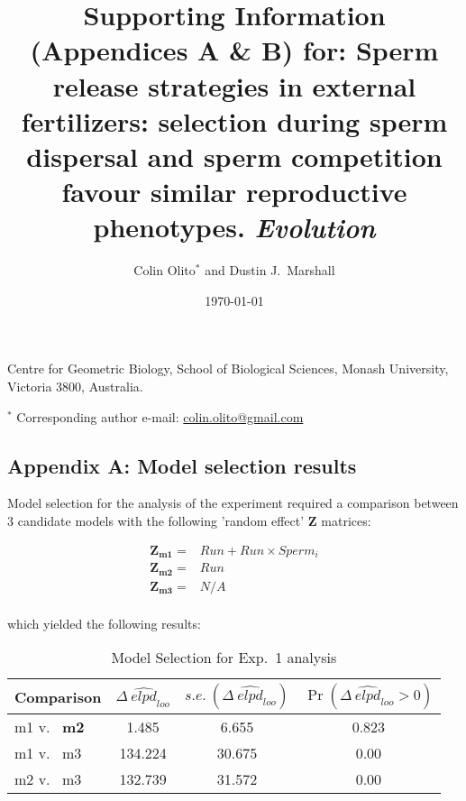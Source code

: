 \documentclass{article}
\title{Supporting Information (Appendices A \& B) for: Sperm release strategies in external fertilizers: selection during sperm dispersal and sperm competition favour similar reproductive phenotypes. \textit{Evolution}}
\author{Colin Olito$^{\ast}$ and Dustin J.~Marshall}
\date{\today}
\begin{document}
\maketitle

\noindent{} Centre for Geometric Biology, School of Biological Sciences, Monash University, Victoria 3800, Australia.
\bigskip

\noindent{} $^\ast$ Corresponding author e-mail: \url{colin.olito@gmail.com}
\bigskip

\newpage




\subsection*{Appendix A: Model selection results}
\renewcommand{\theequation}{S\arabic{equation}}
\setcounter{equation}{0}
\renewcommand{\thefigure}{S\arabic{figure}}
\setcounter{figure}{0}
\renewcommand{\thetable}{S\arabic{table}}
\setcounter{table}{0}


Model selection for the analysis of the  experiment required a comparison between 3 candidate models with the following 'random effect' $\mathbf{Z}$ matrices:

\begin{align*}
	\mathbf{Z_{m1}} = &Run + Run \times Sperm_i \\
	\mathbf{Z_{m2}} = &Run \\
	\mathbf{Z_{m3}} = &N/A \\
\end{align*}

\noindent{} which yielded the following results: 

\begin{table}[!ht]
\caption{Model Selection for Exp.~1 analysis}
\label{Table:Exp1ModComp}
\centering
\begin{tabular}{l c c c } \hline
Comparison & $\Delta~\widehat{\textit{elpd}}_{\textit{loo}}$ & $s.e.~(\Delta~\widehat{\textit{elpd}}_{\textit{loo}})$ & $\Pr(\Delta~\widehat{\textit{elpd}}_{\textit{loo}} > 0)$ \\
\hline
m1 v.~ \textbf{m2}  & 1.485   & 6.655  & 0.823 \\
m1 v.~ m3 & 134.224 & 30.675 & 0.00  \\
m2 v.~ m3 & 132.739 & 31.572 & 0.00  \\
\hline
\end{tabular}
\bigskip{}
\end{table}
\end{document}
